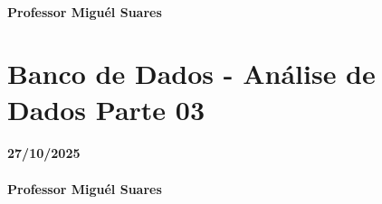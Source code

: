 \documentclass[
]{book}
\begin{document}
\subsubsection*{Professor Miguél Suares}\label{professor-miguuxe9l-suares-10}

\chapter{Banco de Dados - Análise de Dados Parte 03}\label{banco-de-dados---anuxe1lise-de-dados-parte-03}

\subsubsection*{27/10/2025}\label{section-11}

\subsubsection*{Professor Miguél Suares}\label{professor-miguuxe9l-suares-11}

  
\end{document}
